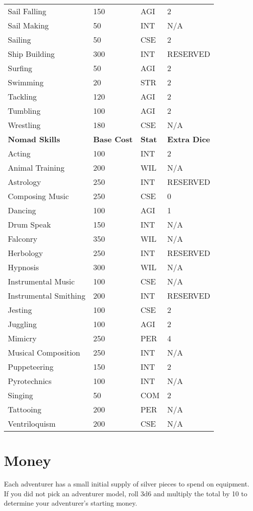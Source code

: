 \begin{multicols*}{2}
\begin{tcolorbox}[breakable,boxrule=0pt]
\begin{xtabular}{l l l l}
Sail Falling & 150 & AGI & 2 \\
Sail Making & 50 & INT & N/A \\
Sailing & 50 & CSE & 2 \\
Ship Building & 300 & INT & RESERVED \\
Surfing & 50 & AGI & 2 \\
Swimming & 20 & STR & 2 \\
Tackling & 120 & AGI & 2 \\
Tumbling & 100 & AGI & 2 \\
Wrestling & 180 & CSE & N/A \\
\midrule
\textbf{Nomad Skills} & \textbf{Base Cost} & \textbf{Stat} & \textbf{Extra Dice}\\
Acting & 100 & INT & 2 \\
Animal Training & 200 & WIL & N/A \\
Astrology & 250 & INT & RESERVED \\
Composing Music & 250 & CSE & 0 \\
Dancing & 100 & AGI & 1 \\
Drum Speak & 150 & INT & N/A \\
Falconry & 350 & WIL & N/A \\
Herbology & 250 & INT & RESERVED \\
Hypnosis & 300 & WIL & N/A \\
Instrumental Music & 100 & CSE & N/A \\
Instrumental Smithing & 200 & INT & RESERVED \\
Jesting & 100 & CSE & 2 \\
Juggling & 100 & AGI & 2 \\
Mimicry & 250 & PER & 4 \\
Musical Composition & 250 & INT & N/A \\
Puppeteering & 150 & INT & 2 \\
Pyrotechnics & 100 & INT & N/A \\
Singing & 50 & COM & 2 \\
Tattooing & 200 & PER & N/A \\
Ventriloquism & 200 & CSE & N/A \\
\end{xtabular}
\end{tcolorbox}
\section{Money}
Each adventurer has a small initial supply of silver pieces to spend on equipment. If you did not pick an adventurer model, roll 3d6 and multiply the total by 10 to determine your adventurer’s starting money.

\end{multicols*}
